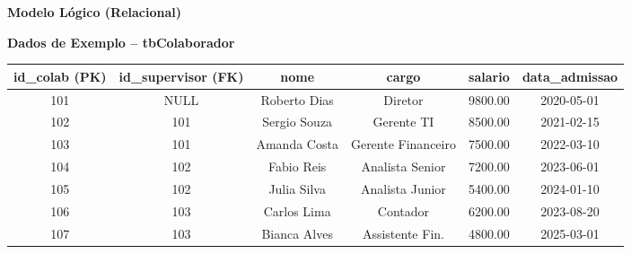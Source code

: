\documentclass[12pt,a4paper]{article}
\begin{document}
\begin{enumerate}[label=\textbf{Exercício \arabic* -}, leftmargin=*, itemsep=2.5em]
\begin{center}
    \textbf{Modelo Lógico (Relacional)} \\[0.2cm]
\end{center}

\begin{center}
    \textbf{Dados de Exemplo -- tbColaborador} \\[0.1cm]
    \scriptsize
    \begin{tabular}{|c|c|c|c|c|c|}
        \hline
        \textbf{id\_colab (PK)} & \textbf{id\_supervisor (FK)} & \textbf{nome} & \textbf{cargo} & \textbf{salario} & \textbf{data\_admissao} \\
        \hline
        101 & NULL        & Roberto Dias  & Diretor          & 9800.00 & 2020-05-01 \\
        102 & 101         & Sergio Souza  & Gerente TI       & 8500.00 & 2021-02-15 \\
        103 & 101         & Amanda Costa  & Gerente Financeiro & 7500.00 & 2022-03-10 \\
        104 & 102         & Fabio Reis    & Analista Senior  & 7200.00 & 2023-06-01 \\
        105 & 102         & Julia Silva   & Analista Junior  & 5400.00 & 2024-01-10 \\
        106 & 103         & Carlos Lima   & Contador         & 6200.00 & 2023-08-20 \\
        107 & 103         & Bianca Alves  & Assistente Fin.  & 4800.00 & 2025-03-01 \\
        \hline
    \end{tabular}
\end{center}


\end{enumerate}
\end{document}
